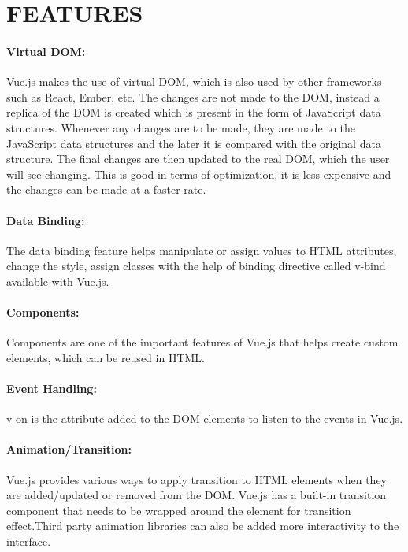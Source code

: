 \documentclass[12pt,a4paper,oneside]{report}
\begin{document}
\section{FEATURES}



\paragraph{Virtual DOM:} 

Vue.js makes the use of virtual DOM, which is also used by other frameworks such as React, Ember, etc. The changes are not made to the DOM, instead a replica of the DOM is created which is present in the form of JavaScript data structures. Whenever any changes are to be made, they are made to the JavaScript data structures and the later it is compared with the original data structure. The final changes are then updated to the real DOM, which the user will see changing. This is good in terms of optimization, it is less expensive and the changes can be made at a faster rate.

\paragraph{Data Binding:}

The data binding feature helps manipulate or assign values to HTML attributes, change the style, assign classes with the help of binding directive called v-bind available with Vue.js.

\paragraph{Components:}

Components are one of the important features of Vue.js that helps create custom elements, which can be reused in HTML.

\paragraph{Event Handling:}

v-on is the attribute added to the DOM elements to listen to the events in Vue.js.

\paragraph{Animation/Transition:}

Vue.js provides various ways to apply transition to HTML elements when they are added/updated or removed from the DOM. Vue.js has a built-in transition component that needs to be wrapped around the element for transition effect.Third party animation libraries can also be added more interactivity to the interface.
\end{document}
